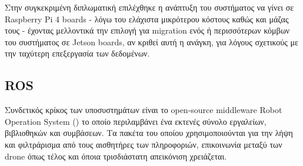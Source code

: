   Στην συγκεκριμένη διπλωματική επιλέχθηκε η ανάπτυξη του συστήματος να γίνει σε Raspberry Pi 4 boards - λόγω του ελάχιστα μικρότερου κόστους καθώς και μάζας τους - έχοντας μελλοντικά την επιλογή για migration ενός ή περισσότερων κόμβων του συστήματος σε Jetson boards, αν κριθεί αυτή η ανάγκη, για λόγους σχετικούς με την ταχύτερη επεξεργασία των δεδομένων.

  \begin{table}[H]
        \caption[]{Jetson Nano Developer Kit Specifications}
        \label{tab:jetson-nano-specs}
        \centering
      \end{table}


\subsection{ROS} \label{sec:ROS}
Συνδετικός κρίκος των υποσυστημάτων είναι το open-source middleware Robot Operation System () \cite{ros} το οποίο 
πε\-ρι\-λα\-μβά\-νει ένα εκτενές σύνολο εργαλείων, βιβλιοθηκών και συ\-μβά\-σεων. Τα πακέτα του οποίου χρησιμοποιούνται για την
λήψη και φιλτράρισμα από τους αισθητήρες των πληροφοριών, επικοινωνία μεταξύ των drone όπως τέλος και 
όποια τρι\-σδιά\-στα\-τη απεικόνιση χρειάζεται.

